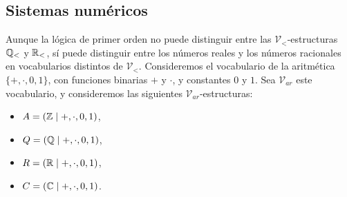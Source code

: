 \message{ !name(main.tex)}\documentclass[12pt,a4paper]{book}
\newcommand{\VV}{\mathcal{V}}
\begin{document}
    \subsection{Sistemas numéricos}

    Aunque la lógica de primer orden no puede distinguir entre las $\VV_{<}$-estructuras $\mathbb{Q}_{<}$ y $\mathbb{R}_{<}$, sí puede
    distinguir entre los números reales y los números racionales en vocabularios distintos de $\VV_{<}$. Consideremos el
    vocabulario de la aritmética $\{+,\cdot,0,1\}$, con funciones binarias $+$ y $\cdot$, y constantes $0$ y $1$. Sea
    $\VV_{ar}$ este vocabulario, y consideremos las siguientes $\VV_{ar}$-estructuras:

    \begin{itemize}
        \item[$\bullet$] $A=(\mathbb{Z}\mid+,\cdot,0,1)$,
        \item[$\bullet$] $Q=(\mathbb{Q}\mid+,\cdot,0,1)$,
        \item[$\bullet$] $R=(\mathbb{R}\mid+,\cdot,0,1)$,
        \item[$\bullet$] $C=(\mathbb{C}\mid+,\cdot,0,1)$.
    \end{itemize}
\end{document}
